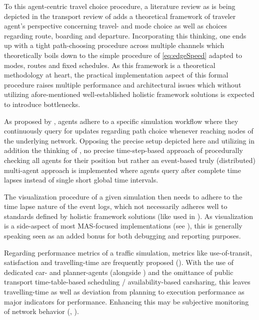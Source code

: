 To this agent-centric travel choice procedure, a literature review as is being depicted in the transport review of \cite{brakewood2018literature} adds a theoretical framework of traveler agent's perspective concerning travel- and mode choice as well as choices regarding route, boarding and departure. Incorporating this thinking, one ends up with a tight path-choosing procedure across multiple channels which theoretically boils down to the simple procedure of \autoref{eq:edgeSpeed} adapted to modes, routes and fixed schedules.
As this framework is a theoretical methodology at heart, the practical implementation aspect of this formal procedure raises multiple performance and architectural issues which without utilizing afore-mentioned well-established holistic framework solutions is expected to introduce bottlenecks.

As proposed by \cite{zargayouna2013agent}, agents adhere to a specific simulation workflow where they continuously query for updates regarding path choice whenever reaching nodes of the underlying network. Opposing the precise setup depicted here and utilizing in addition the thinking of \cite{mastio2015towards}, no precise time-step-based approach of procedurally checking all agents for their position but rather an event-based truly (distributed) multi-agent approach is implemented where agents query after complete time lapses instead of single short global time intervals. 

The visualization procedure of a given simulation then needs to adhere to the time lapse nature of the event logs, which not necessarily adheres well to standards defined by holistic framework solutions (like used in \cite{zargayouna2013agent}\cite{ksontini2016building}). As visualization is a side-aspect of most MAS-focused implementations (see \cite{mastio2015towards}), this is generally speaking seen as an added bonus for both debugging and reporting purposes.

Regarding performance metrics of a traffic simulation, metrics like use-of-transit, satisfaction and travelling-time are frequently proposed (\cite{brakewood2018literature}). With the use of dedicated car- and planner-agents (alongside \cite{zargayouna2013agent}) and the omittance of public transport time-table-based scheduling / availability-based carsharing, this leaves travelling-time as well as deviation from planning to execution performance as major indicators for performance.
Enhancing this may be subjective monitoring of network behavior (\cite{brakewood2018literature}, \cite{zargayouna2013agent}).

